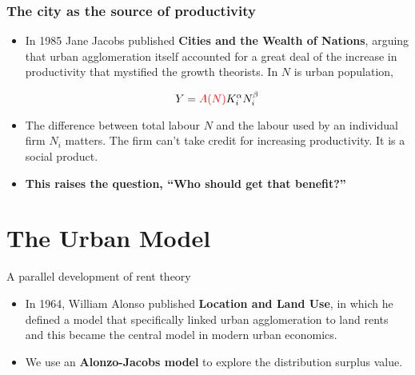 \documentclass[notes]{beamer}
\begin{document}
\begin{frame}\frametitle{The city as the source of productivity}
\begin{itemize}

\item In 1985 Jane Jacobs published \textbf{Cities and the Wealth of Nations}, arguing that urban agglomeration itself accounted for a great deal of the increase in productivity that mystified the growth theorists. In $N$ is urban population,

\[Y=  \textcolor{red} {A(N)}K_i^\alpha N_i^\beta\]

\item The difference between total labour $N$ and the labour used by an individual firm  $N_i$  matters. The firm can't take credit for increasing productivity. It is a social product.

\item \textbf{This raises the question, ``Who should get that benefit?''}

\end {itemize}

\end{frame}


\section{The Urban Model}%
{A parallel development of rent theory}
\begin{itemize} 

\item In 1964, William Alonso published \textbf{Location and Land Use}, in which he defined a model %
that specifically linked urban agglomeration to land rents and this became the central model in modern urban economics.

\item We use an \textbf{Alonzo-Jacobs model} to explore the distribution surplus value.
\end {itemize}
\end{document}
